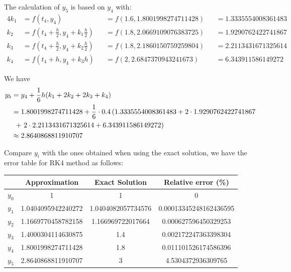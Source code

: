 \documentclass[a4paper]{article}
\numberwithin{equation}{section}
\begin{document}
The calculation of \(y_5\) is based on \(y_4\) with:
\begin{alignat*}{4}
  k_1 & = f(t_4, y_4)                                            &  & = f(1.6, 1.8001998274711428) &  & = 1.3335554008361483 \\
  k_2 & = f \left(t_4 + \frac{h}{2}, y_4 + k_1\frac{h}{2}\right) &  & = f(1.8, 2.0669109076383725) &  & = 1.9290762422741867 \\
  k_3 & = f \left(t_4 + \frac{h}{2}, y_4 + k_2\frac{h}{2}\right) &  & = f(1.8, 2.1860150759259804) &  & = 2.2113431671325614 \\
  k_4 & = f(t_4 + h, y_4 + k_3h)                                 &  & = f(2, 2.6847370943241673)   &  & = 6.343911586149272
\end{alignat*}

We have
\begin{align*}
  y_5 & = y_4 + \frac{1}{6}h(k_1 + 2k_2 + 2k_3 + k_4)                                                            \\
      & = 1.8001998274711428 + \frac{1}{6} \cdot 0.4\left(1.3335554008361483 + 2 \cdot 1.9290762422741867\right. \\
      & \ \left.+\ 2 \cdot 2.2113431671325614 + 6.343911586149272\vphantom{1}\right)                             \\
      & \approx 2.8640868811910707
\end{align*}

Compare \(y_i\) with the ones obtained when using the exact solution, we have the error table for RK4 method as follows:

\begin{table}[H]
  \centering
  \begin{tabular}{@{}cS[table-format=1.16]S[table-format=1.16]S[table-format=1.20]@{}}
    \toprule
    {}      & {Approximation}    & {Exact Solution}   & {Relative error (\%)}  \\
    \midrule
    \(y_0\) & 1                  & 1                  & 0                      \\
    \(y_1\) & 1.0404095942240272 & 1.0404082057734576 & 0.00013345248162436595 \\
    \(y_2\) & 1.1669770458782158 & 1.166969722017664  & 0.000627596450329253   \\
    \(y_3\) & 1.4000304114630875 & 1.4                & 0.002172247363398304   \\
    \(y_4\) & 1.8001998274711428 & 1.8                & 0.011101526174586396   \\
    \(y_5\) & 2.8640868811910707 & 3                  & 4.5304372936309765     \\
    \bottomrule
  \end{tabular}
\end{table}
\end{document}
